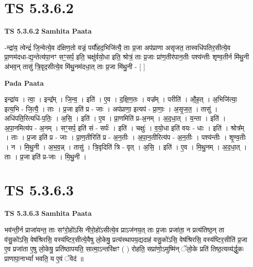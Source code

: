 \documentclass[17pt]{extarticle}
\begin{document}

\section{ TS 5.3.6.2 }

\textbf{TS 5.3.6.2 } \newline
\textbf{Samhita Paata} \newline

-न्द्रा॑य॒ त्वेन्द्रं॑ जि॒न्वेत्ये॒व द॑क्षिण॒तो वज्रं॒ पर्यौ॑हद॒भिजि॑त्यै॒ ताः प्र॒जा अप॑प्राणा असृजत॒ तास्वधि॑पतिर॒सीत्ये॒व प्रा॒णम॑दधा-द्य॒न्तेत्य॑पा॒नꣳ सꣳ॒॒सर्प॒ इति॒ चक्षु॑र्वयो॒धा इति॒ श्रोत्रं॒ ताः प्र॒जाः प्रा॑ण॒तीर॑पान॒तीः पश्य॑न्तीः शृण्व॒तीर्न मि॑थु॒नी अ॑भव॒न् तासु॑ त्रि॒वृद॒सीत्ये॒व मि॑थु॒नम॑दधा॒त् ताः प्र॒जा मि॑थु॒नी - [  ] \newline

\textbf{Pada Paata} \newline

इन्द्रा॑य । त्वा॒ । इन्द्र᳚म् । जि॒न्व॒ । इति॑ । ए॒व । द॒क्षि॒ण॒तः । वज्र᳚म् । परीति॑ । औ॒ह॒त् । अ॒भिजि॑त्या॒ इत्य॒भि - जि॒त्यै॒ । ताः । प्र॒जा इति॑ प्र - जाः । अप॑प्राणा॒ इत्यप॑ - प्रा॒णाः॒ । अ॒सृ॒ज॒त॒ । तासु॑ । अधि॑पति॒रित्यधि॑-प॒तिः॒ । अ॒सि॒ । इति॑ । ए॒व । प्रा॒णमिति॑ प्र-अ॒नम् । अ॒द॒धा॒त् । य॒न्ता । इति॑ । अ॒पा॒नमित्य॑प - अ॒नम् । सꣳ॒॒सर्प॒ इति॑ सं - सर्पः॑ । इति॑ । चक्षुः॑ । व॒यो॒धा इति॑ वयः - धाः । इति॑ । श्रोत्र᳚म् । ताः । प्र॒जा इति॑ प्र - जाः । प्रा॒ण॒तीरिति॑ प्र - अ॒न॒तीः । अ॒पा॒न॒तीरित्य॑प - अ॒न॒तीः । पश्य॑न्तीः । शृ॒ण्व॒तीः । न । मि॒थु॒नी । अ॒भ॒व॒न्न् । तासु॑ । त्रि॒वृदिति॑ त्रि - वृत् । अ॒सि॒ । इति॑ । ए॒व । मि॒थु॒नम् । अ॒द॒धा॒त् । ताः । प्र॒जा इति॑ प्र-जाः । मि॒थु॒नी ।  \newline





\section{ TS 5.3.6.3 }

\textbf{TS 5.3.6.3 } \newline
\textbf{Samhita Paata} \newline

भव॑न्ती॒र्न प्राजा॑यन्त॒ ताः सꣳ॑रो॒हो॑ऽसि नीरो॒हो॑ऽसीत्ये॒व प्राऽज॑नय॒त् ताः प्र॒जाः प्रजा॑ता॒ न प्रत्य॑तिष्ठ॒न् ता व॑सु॒को॑ऽसि॒ वेष॑श्रिरसि॒ वस्य॑ष्टिर॒सीत्ये॒वैषु लो॒केषु॒ प्रत्य॑स्थापय॒द्यदाह॑ वसु॒को॑ऽसि॒ वेष॑श्रिरसि॒ वस्य॑ष्टिर॒सीति॑ प्र॒जा ए॒व प्रजा॑ता ए॒षु लो॒केषु॒ प्रति॑ष्ठापयति॒ सात्मा॒ऽन्तरि॑क्षꣳ ( ) रोहति॒ सप्रा॑णो॒ऽमुष्मि॑न् ॅलो॒के प्रति॑ तिष्ठ॒त्यव्य॑र्द्धुकः प्राणापा॒नाभ्यां᳚ भवति॒ य ए॒वं ॅवेद॑ ॥ \newline
\end{document}
